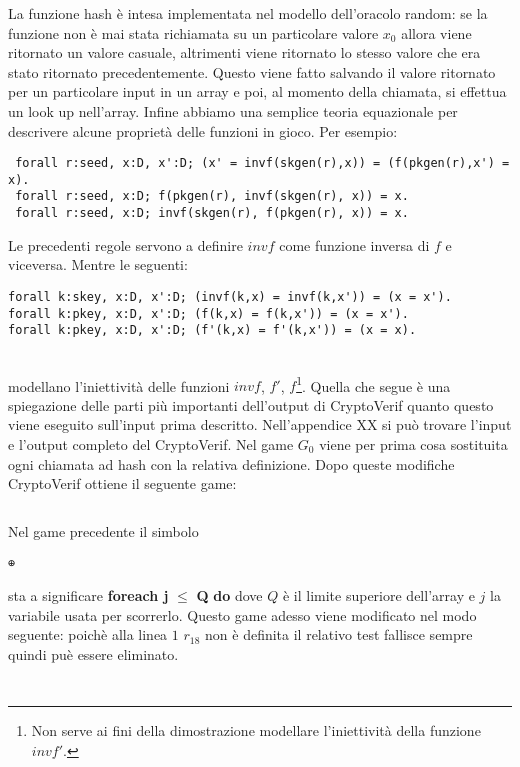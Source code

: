 \documentclass[a4paper,openright,twoside,12pt]{report}
\newcommand{\foreach}[2]{\textbf{foreach #1} $\leq$ \textbf{#2} \textbf{do}}
\begin{document}
La funzione hash \`e intesa implementata nel modello dell'oracolo random: se la funzione non \`e mai stata richiamata su un particolare valore $x_0$ allora viene ritornato un valore casuale, 
altrimenti viene ritornato lo stesso valore che era stato ritornato precedentemente. Questo viene fatto salvando il valore ritornato per un particolare input in un array e poi,
al momento della chiamata, si effettua un look up nell'array.
Infine abbiamo una semplice teoria equazionale per descrivere alcune propriet\`a delle funzioni in gioco.\newpage
Per esempio:
\begin{verbatim}
 forall r:seed, x:D, x':D; (x' = invf(skgen(r),x)) = (f(pkgen(r),x') = x).
 forall r:seed, x:D; f(pkgen(r), invf(skgen(r), x)) = x.
 forall r:seed, x:D; invf(skgen(r), f(pkgen(r), x)) = x.
\end{verbatim}
Le precedenti regole servono a definire $invf$ come funzione inversa di $f$ e viceversa. Mentre le seguenti:
\begin{verbatim}
forall k:skey, x:D, x':D; (invf(k,x) = invf(k,x')) = (x = x').
forall k:pkey, x:D, x':D; (f(k,x) = f(k,x')) = (x = x').
forall k:pkey, x:D, x':D; (f'(k,x) = f'(k,x')) = (x = x).
\end{verbatim}\\
modellano l'iniettivit\`a delle funzioni $invf$, $f'$, $f$\footnote{Non serve ai fini della dimostrazione modellare l'iniettivit\`a della funzione $invf'$.}.
Quella che segue \`e una spiegazione delle parti pi\`u importanti dell'output di CryptoVerif quanto questo viene eseguito sull'input prima descritto.
Nell'appendice XX si pu\`o trovare l'input e l'output completo del CryptoVerif.
Nel game $G_0$ viene per prima cosa sostituita ogni chiamata ad hash con la relativa definizione.
Dopo queste modifiche CryptoVerif ottiene il seguente game:
\begin{verbatim}
\end{verbatim}
Nel game precedente il simbolo \begin{verbatim}⊕\end{verbatim}
sta a significare \foreach{j}{Q} dove $Q$ \`e il limite superiore dell'array e $j$ la variabile usata per scorrerlo. 
Questo game adesso viene modificato nel modo seguente: poich\`e alla linea $1$ $r_{18}$ non \`e definita il relativo test fallisce sempre quindi pu\`e essere eliminato.
\begin{verbatim}
\end{verbatim}
\begin{verbatim}
\end{verbatim}
\end{document}
